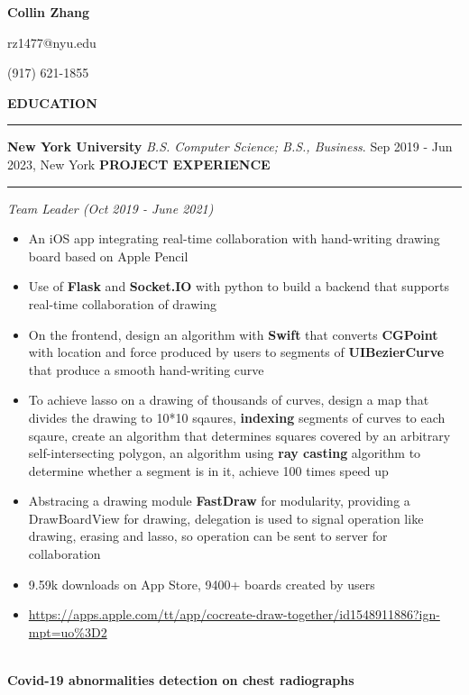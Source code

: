 \documentclass{article}
\begin{document}
\begin{center}
{\huge \textbf{Collin Zhang}}\par
rz1477@nyu.edu\par(917) 621-1855
\end{center}

\noindent
{\textbf{EDUCATION}}\newline
\rule{\textwidth}{1pt}
{\textbf {New York University}}\newline
\emph {B.S. Computer Science; B.S., Business}.\newline
{Sep 2019 - Jun 2023, New York}\newline
\newline
\noindent
{\textbf{PROJECT EXPERIENCE}}\newline
\rule{\textwidth}{1pt}\newline
\emph{Team Leader (Oct 2019 - June 2021)}
\begin{itemize}[leftmargin=*,topsep=0pt]
\item An iOS app integrating real-time collaboration with hand-writing drawing board based on Apple Pencil
\item Use of \textbf{Flask} and \textbf{Socket.IO} with python to build a backend that supports real-time collaboration of drawing
\item On the frontend, design an algorithm with \textbf{Swift} that converts \textbf{CGPoint} with location and force produced by users to segments of \textbf{UIBezierCurve} that produce a smooth hand-writing curve
\item To achieve lasso on a drawing of thousands of curves, design a map that divides the drawing to 10*10 sqaures, \textbf{indexing} segments of curves to each sqaure, create an algorithm that determines squares covered by an arbitrary self-intersecting polygon, an algorithm using \textbf{ray casting} algorithm to determine whether a segment is in it, achieve 100 times speed up
\item Abstracing a drawing module \textbf{FastDraw} for modularity, providing a DrawBoardView for drawing, delegation is used to signal operation like drawing, erasing and lasso, so operation can be sent to server for collaboration
\item 9.59k downloads on App Store, 9400+ boards created by users
\item \url{https://apps.apple.com/tt/app/cocreate-draw-together/id1548911886?ign-mpt=uo%3D2}

\end{itemize} \ \\ {\textbf{Covid-19 abnormalities detection on chest radiographs}}\newline
\end{document}
